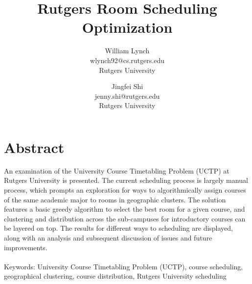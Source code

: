 \documentclass[12pt]{article}
\title{Rutgers Room Scheduling Optimization}
\author {William Lynch \\ wlynch92@cs.rutgers.edu \\ Rutgers University
	\and Jingfei Shi \\ jenny.shi@rutgers.edu \\ Rutgers University
}
\begin{document}
\maketitle
\section{Abstract}
An examination of the University Course Timetabling Problem (UCTP) at Rutgers
University is presented. The current scheduling process is largely manual
process, which prompts an exploration for ways to algorithmically assign
courses of the same academic major to rooms in geographic clusters. The
solution features a basic greedy algorithm to select the best room for a given
course, and clustering and distribution across the sub-campuses for
introductory courses can be layered on top. The results for different ways to
scheduling are displayed, along with an analysis and subsequent discussion of
issues and future improvements. 
\\\\
Keywords: University Course Timetabling Problem (UCTP), course scheduling,
geographical clustering, course distribution, Rutgers University scheduling
\end{document}
